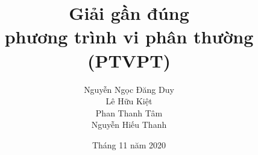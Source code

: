 \usepackage{lmodern}
\usepackage[utf8]{vietnam}
\usepackage{graphicx}
\usepackage{stackengine}
\usepackage{bookman} %
\usepackage{multirow,multicol,booktabs} %

\hypersetup{unicode=true}
\everymath{\displaystyle}


\renewcommand{\baselinestretch}{1.15}
\setlength{\parindent}{0pt}
\setlength{\parskip}{4pt}
\newcommand\tabularrowheight[2][0]{\addstackgap[.5\dimexpr#2\relax]{\vphantom{#1}}}

\title[Phương trình vi phân]{Giải gần đúng \\phương trình vi phân thường (PTVPT)}
\author[Nhóm 3]{Nguyễn Ngọc Đăng Duy\\Lê Hữu Kiệt\\Phan Thanh Tâm\\Nguyễn Hiếu Thanh}

\date[11/2020]{Tháng 11 năm 2020}
